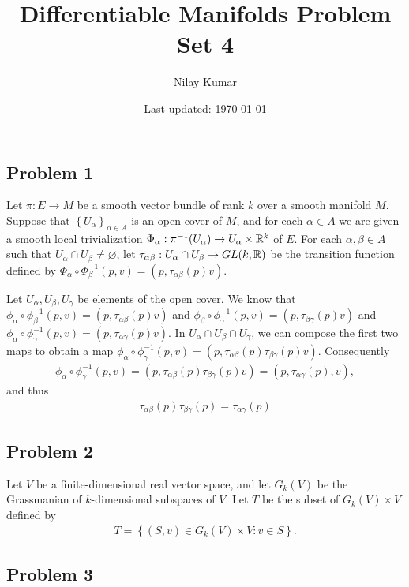 \documentclass{../../mathnotes}
\title{Differentiable Manifolds Problem Set 4}
\author{Nilay Kumar}
\date{Last updated: \today}
\begin{document}
\maketitle

\subsection*{Problem 1}

Let $\pi: E\to M$ be a smooth vector bundle of rank $k$ over a smooth manifold $M$. Suppose that $\left\{ U_\alpha \right\}_{\alpha\in A}$
is an open cover of $M$, and for each $\alpha\in A$ we are given a smooth local trivialization $\Phi_\alpha:\pi^{-1}(U_\alpha)\to U_\alpha\times\mathbb{R}^k$
of $E$. For each $\alpha,\beta\in A$ such that $U_\alpha\cap U_\beta\neq\varnothing$, let $\tau_{\alpha\beta}:U_\alpha\cap U_\beta\to GL(k,\mathbb{R})$ be
the transition function defined by $\Phi_\alpha\circ\Phi_\beta^{-1}(p,v)=(p,\tau_{\alpha\beta}(p)v)$.

Let $U_\alpha,U_\beta,U_\gamma$ be elements of the open cover. We know that $\phi_\alpha\circ\phi^{-1}_\beta(p,v)=(p,\tau_{\alpha\beta}(p)v)$
and $\phi_\beta\circ\phi^{-1}_\gamma(p,v)=(p,\tau_{\beta\gamma}(p)v)$ and $\phi_\alpha\circ\phi^{-1}_\gamma(p,v)=(p,\tau_{\alpha\gamma}(p)v)$.
In $U_\alpha\cap U_\beta\cap U_\gamma$, we can compose the first two maps to obtain a map $\phi_\alpha\circ\phi^{-1}_\gamma(p,v)=(p,\tau_{\alpha\beta}(p)\tau_{\beta\gamma}(p)v)$.
Consequently
\begin{align*}
    \phi_\alpha\circ\phi^{-1}_\gamma(p,v)=(p,\tau_{\alpha\beta}(p)\tau_{\beta\gamma}(p)v)=(p,\tau_{\alpha\gamma}(p),v),
\end{align*}
and thus
\begin{align*}
    \tau_{\alpha\beta}(p)\tau_{\beta\gamma}(p)=\tau_{\alpha\gamma}(p)
\end{align*}

\subsection*{Problem 2}

Let $V$ be a finite-dimensional real vector space, and let $G_k(V)$ be the Grassmanian of $k$-dimensional subspaces of $V$. Let $T$
be the subset of $G_k(V)\times V$ defined by
\begin{align*}
    T=\left\{ (S,v)\in G_k(V)\times V:v\in S \right\}.
\end{align*}

\subsection*{Problem 3}
\end{document}
